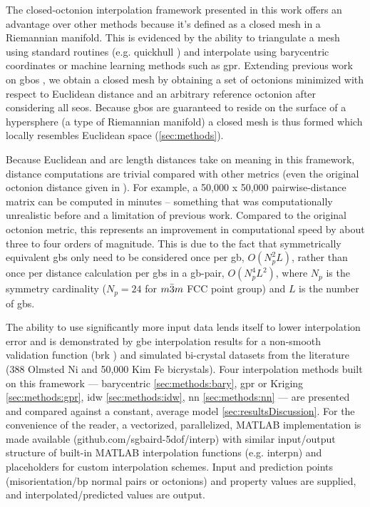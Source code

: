 \documentclass[preprint,12pt]{elsarticle}
\begin{document}
The closed-octonion interpolation framework presented in this work offers an advantage over other methods because it's defined as a closed mesh in a Riemannian manifold. This is evidenced by the ability to triangulate a mesh using standard routines (e.g. quickhull \cite{qhull}) and interpolate using barycentric coordinates or machine learning methods such as \gls{gpr}. Extending previous work on \glspl{gbo} \cite{Francis2019ABoundaries,Chesser2020LearningProperties}, we obtain a closed mesh by obtaining a set of octonions minimized with respect to Euclidean distance and an arbitrary reference octonion after considering all \glspl{seo}. Because \glspl{gbo} are guaranteed to reside on the surface of a hypersphere \cite{Francis2019ABoundaries} (a type of Riemannian manifold) a closed mesh is thus formed which locally resembles Euclidean space (\ref{sec:methods}).

Because Euclidean and arc length distances take on meaning in this framework, distance computations are trivial compared with other metrics (even the original octonion distance given in \cite{Francis2019ABoundaries}). For example, a 50,000 x 50,000 pairwise-distance matrix can be computed in minutes -- something that was computationally unrealistic before and a limitation of previous work. Compared to the original octonion metric, this represents an improvement in computational speed by about three to four orders of magnitude. This is due to the fact that symmetrically equivalent \glspl{gb} only need to be considered once per \gls{gb}, $O(N_p^2L)$, rather than once per distance calculation per \glspl{gb} in a \gls{gb}-pair, $O(N_p^4L^2)$, where $N_p$ is the symmetry cardinality ($N_p=24$ for $m\Bar{3}m$ FCC point group) and $L$ is the number of \glspl{gb}. %

The ability to use significantly more input data lends itself to lower interpolation error and is demonstrated by \gls{gbe} interpolation results for a non-smooth validation function (\gls{brk} \cite{Bulatov2014GrainMetals}) and simulated bi-crystal datasets from the literature (388 Olmsted Ni \cite{Olmsted2009SurveyEnergy} and 50,000 Kim Fe \cite{Kim2011AnDatabase} bicrystals). Four interpolation methods built on this framework --- barycentric \ref{sec:methods:bary}, \gls{gpr} or Kriging \ref{sec:methods:gpr}, \gls{idw} \ref{sec:methods:idw}, \gls{nn} \ref{sec:methods:nn} --- are presented and compared against a constant, average model \ref{sec:resultsDiscussion}. For the convenience of the reader, a vectorized, parallelized, MATLAB implementation is made available (github.com/sgbaird-5dof/interp) with similar input/output structure of built-in MATLAB interpolation functions (e.g. interpn) and placeholders for custom interpolation schemes. Input and prediction points (misorientation/\gls{bp} normal pairs or octonions) and property values are supplied, and interpolated/predicted values are output.
\end{document}
